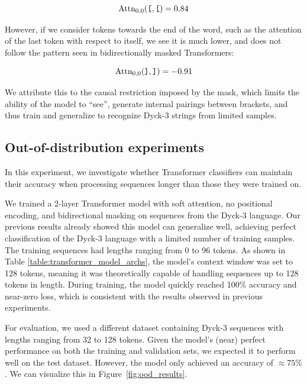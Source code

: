 \begin{equation}
    \text{Attn}_{0, 0}(\verb|[|, \verb|[|) = 0.84
\end{equation}

However, if we consider tokens towards the end of the word, such as the attention of the last token with respect to itself, we see it is much lower, and does not follow the pattern seen in bidirectionally masked Transformers:

\begin{equation}
    \text{Attn}_{0, 0}(\verb|]|, \verb|]|) = -0.91
\end{equation}

We attribute this to the causal restriction imposed by the mask, which limits the ability of the model to ``see'', generate internal pairings between brackets, and thus train and generalize to recognize Dyck-3 strings from limited samples.

\subsection{Out-of-distribution experiments} \label{subsection:ood-experiment}

In this experiment, we investigate whether Transformer classifiers can maintain their accuracy when processing sequences longer than those they were trained on.

We trained a 2-layer Transformer model with soft attention, no positional encoding, and bidirectional masking on sequences from the Dyck-3 language. Our previous results already showed this model can generalize well, achieving perfect classification of the Dyck-3 language with a limited number of training samples. The training sequences had lengths ranging from 0 to 96 tokens. As shown in Table \ref{table:transformer_model_archs}, the model’s context window was set to 128 tokens, meaning it was theoretically capable of handling sequences up to 128 tokens in length. During training, the model quickly reached 100\% accuracy and near-zero loss, which is consistent with the results observed in previous experiments.

For evaluation, we used a different dataset containing Dyck-3 sequences with lengths ranging from 32 to 128 tokens. Given the model’s (near) perfect performance on both the training and validation sets, we expected it to perform well on the test dataset. However, the model only achieved an accuracy of $\approx 75\%$. We can visualize this in Figure~\ref{fig:ood_results}.

